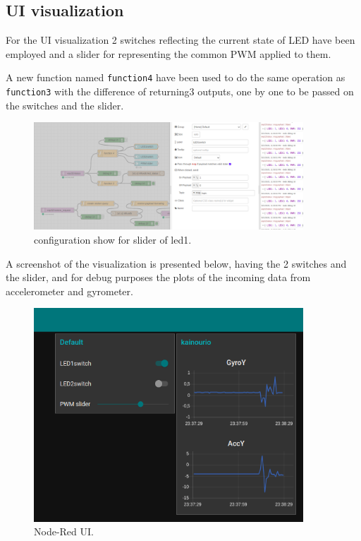 \documentclass[a4paper,12pt]{article}
\begin{document}
\subsection{UI visualization}

For the UI visualization 2 switches reflecting the current state of LED have been employed 
and a slider for representing the common PWM applied to them.

A new function named \texttt{function4} have been used to do the same operation as 
\texttt{function3} with the difference of returning3 outputs, one by one to be passed
on the switches and the slider.


		\begin{figure}[H]
			\centering
			\includegraphics[width=0.9\textwidth]{ui_conf.png}
			\caption{configuration show for slider of led1.}
			\label{fig1:}
		\end{figure}		

	
	A screenshot of the visualization is presented below, having the 2 switches and the slider,
	and for debug purposes the plots of the incoming data from accelerometer and gyrometer.

		\begin{figure}[H]
			\centering
			\includegraphics[width=0.9\textwidth]{ui_threshold.png}
			\caption{Node-Red UI.}
			\label{fig1:}
		\end{figure}		
\end{document}
